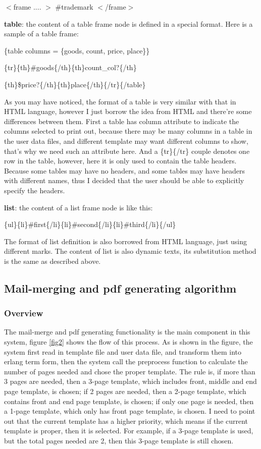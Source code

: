 \documentclass{report}
\begin{document}
  $<$frame .... $>$ \#trademark $<$/frame$>$

  \textbf{table}: the content of a table frame node is defined in a special format. Here is a sample of a table frame:

\{table columns = \{goods, count, price, place\}\}

\{tr\}\{th\}\#goods\{/th\}\{th\}count\_col?\{/th\}

\{th\}\$price?\{/th\}\{th\}place\{/th\}\{/tr\}\{/table\}

  As you may have noticed, the format of a table is very similar with that in HTML language, however I just borrow the idea from HTML and there're some differences between them. First a table has column attribute to indicate the columns selected to print out, because there may be many columns in a table in the user data files, and different template may want different columns to show, that's why we need such an attribute here. And a \{tr\}\{/tr\} couple denotes one row in the table, however, here it is only used to contain the table headers. Because some tables may have no headers, and some tables may have headers with different names, thus I decided that the user should be able to explicitly specify the headers. 

  \textbf{list}: the content of a list frame node is like this:

\{ul\}\{li\}\#first\{/li\}\{li\}\#second\{/li\}\{li\}\#third\{/li\}\{/ul\}

  The format of list definition is also borrowed from HTML language, just using different marks. The content of list is also dynamic texts, its substitution method is the same as described above. 
  
\subsection{Mail-merging and pdf generating algorithm}
\subsubsection{Overview}

  The mail-merge and pdf generating functionality is the main component in this system, figure \ref{fig2} shows the flow of this process. As is shown in the figure, the system first read in template file and user data file, and transform them into erlang term form, then the system call the preprocess function to calculate the number of pages needed and chose the proper template. The rule is, if more than 3 pages are needed, then a 3-page template, which includes front, middle and end page template, is chosen; if 2 pages are needed, then a 2-page template, which contains front and end page template, is chosen; if only one page is needed, then a 1-page template, which only has front page template, is chosen. I need to point out that the current template has a higher priority, which means if the current template is proper, then it is selected. For example, if a 3-page template is used, but the total pages needed are 2, then this 3-page template is still chosen. 
\end{document}
